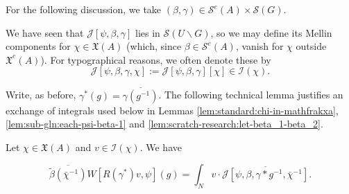 For the following discussion, we take $(\beta,\gamma) \in \mathcal{S}^e(A) \times \mathcal{S}(G)$.

We have seen that $\mathcal{J}[\psi,\beta,\gamma]$ lies in $\mathcal{S}(U \backslash G)$, so we may define its Mellin components for $\chi \in \mathfrak{X}(A)$ (which, since $\beta \in \mathcal{S}^e(A)$, vanish for $\chi$ outside $\mathfrak{X}^e(A)$).  For typographical reasons, we often denote these by
\begin{equation*}
  \mathcal{J}[\psi,\beta,\gamma,\chi] := \mathcal{J}[\psi,\beta,\gamma][\chi] \in \mathcal{I}(\chi).
\end{equation*}

Write, as before, $\gamma^*(g) = \overline{\gamma(g^{-1})}$.  The following technical lemma justifies an exchange of integrals used below in Lemmas \ref{lem:standard:chi-in-mathfrakxa}, \ref{lem:sub-gln:each-psi-beta-1} and \ref{lem:scratch-research:let-beta_1-beta_2}.
\begin{lemma}\label{lem:scratch-research:let-chi-in}
  Let $\chi \in \mathfrak{X}(A)$ and $v \in \mathcal{I}(\chi)$.   We have

  \begin{equation}\label{eq:int-_n-v}
    \overline{\tilde{\beta}(\bar{\chi}^{-1})}
    W[R(\gamma^*) v,\psi](g)
    =
    \int_{N} v \cdot \overline{\mathcal{J}[\psi, \beta, \gamma \ast g^{-1}, \bar{\chi}^{-1}]}.
  \end{equation}
\end{lemma}
